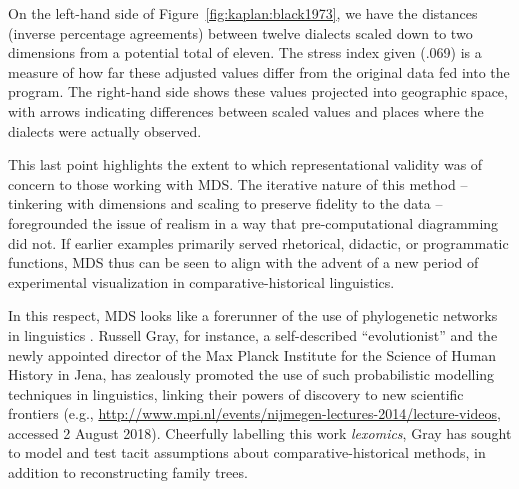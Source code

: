 \documentclass[output=paper]{langscibook}
\begin{document}
On the left-hand side of Figure~\ref{fig:kaplan:black1973}, we have the distances (inverse percentage agreements) between twelve dialects scaled down to two dimensions from a potential total of eleven. The stress index given (.069) is a measure of how far these adjusted values differ from the original data fed into the program. The right-hand side shows these values projected into geographic space, with arrows indicating differences between scaled values and places where the dialects were actually observed.

This last point highlights the extent to which representational validity was of concern to those working with MDS. The iterative nature of this method – tinkering with dimensions and scaling to preserve fidelity to the data – foregrounded the issue of realism in a way that pre-computational diagramming did not. If earlier examples primarily served rhetorical, didactic, or programmatic functions, MDS thus can be seen to align with the advent of a new period of experimental visualization in comparative-historical linguistics.

In this respect, MDS looks like a forerunner of the use of phylogenetic networks in linguistics \citep{Stevens2013}. Russell Gray, for instance, a self-described ``evolutionist'' and the newly appointed director of the Max Planck Institute for the Science of Human History in Jena, has zealously promoted the use of such probabilistic modelling techniques in linguistics, linking their powers of discovery to new scientific frontiers (e.g., \url{http://www.mpi.nl/events/nijmegen-lectures-2014/lecture-videos}, accessed 2 August 2018). Cheerfully labelling this work \emph{lexomics}, Gray has sought to model and test tacit assumptions about comparative-historical methods, in addition to reconstructing family trees.
\end{document}
